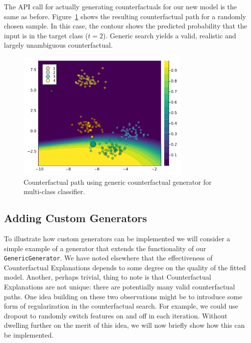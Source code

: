 \documentclass{juliacon}
\begin{document}
The API call for actually generating counterfactuals for our new model
is the same as before. Figure~\ref{fig-multi} shows the resulting
counterfactual path for a randomly chosen sample. In this case, the
contour shows the predicted probability that the input is in the target
class (\(t=2\)). Generic search yields a valid, realistic and largely
unambiguous counterfactual.

\begin{figure}

{\centering \includegraphics[width=3.33333in,height=2.5in]{www/ce_multi.png}

}

\caption{\label{fig-multi}Counterfactual path using generic
counterfactual generator for multi-class classifier.}

\end{figure}

\hypertarget{sec-custom-gen}{%
\subsection{Adding Custom Generators}\label{sec-custom-gen}}

To illustrate how custom generators can be implemented we will consider
a simple example of a generator that extends the functionality of our
\texttt{GenericGenerator}. We have noted elsewhere that the
effectiveness of Counterfactual Explanations depends to some degree on
the quality of the fitted model. Another, perhaps trivial, thing to note
is that Counterfactual Explanations are not unique: there are
potentially many valid counterfactual paths. One idea building on these
two observations might be to introduce some form of regularization in
the counterfactual search. For example, we could use dropout to randomly
switch features on and off in each iteration. Without dwelling further
on the merit of this idea, we will now briefly show how this can be
implemented.
\end{document}
